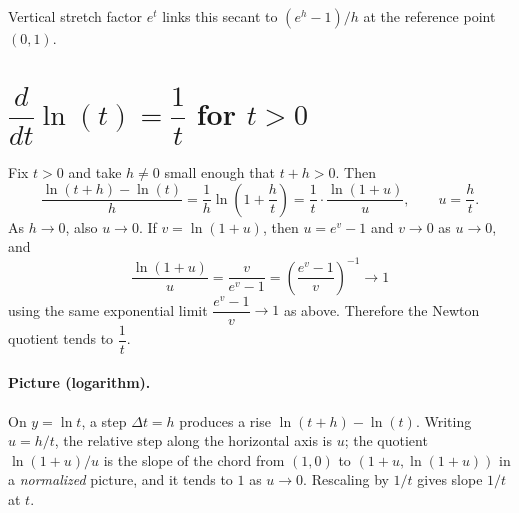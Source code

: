 \documentclass[11pt]{article}
\begin{document}
\begin{center}
\\[0.5em]
{\small Vertical stretch factor \(e^{t}\) links this secant to \((e^{h}-1)/h\) at the reference point \((0,1)\).}
\end{center}

\section*{\(\dfrac{d}{dt}\ln(t)=\dfrac{1}{t}\) for \(t>0\)}
Fix \(t>0\) and take \(h\neq 0\) small enough that \(t+h>0\). Then
\[
\frac{\ln(t+h)-\ln(t)}{h}
=\frac{1}{h}\ln\!\left(1+\frac{h}{t}\right)
=\frac{1}{t}\cdot\frac{\ln(1+u)}{u},
\qquad u=\frac{h}{t}.
\]
As \(h\to 0\), also \(u\to 0\). If \(v=\ln(1+u)\), then \(u=e^{v}-1\) and \(v\to 0\)
as \(u\to 0\), and
\[
\frac{\ln(1+u)}{u}=\frac{v}{e^{v}-1}
=\left(\frac{e^{v}-1}{v}\right)^{-1}\longrightarrow 1
\]
using the same exponential limit \(\dfrac{e^{v}-1}{v}\to 1\) as above. Therefore the
Newton quotient tends to \(\dfrac{1}{t}\).

\paragraph{Picture (logarithm).}
On \(y=\ln t\), a step \(\Delta t=h\) produces a rise \(\ln(t{+}h)-\ln(t)\). Writing
\(u=h/t\), the relative step along the horizontal axis is \(u\); the quotient
\(\ln(1+u)/u\) is the slope of the chord from \((1,0)\) to \((1{+}u,\ln(1{+}u))\) in a
\emph{normalized} picture, and it tends to \(1\) as \(u\to 0\). Rescaling by \(1/t\)
gives slope \(1/t\) at \(t\).
\end{document}
